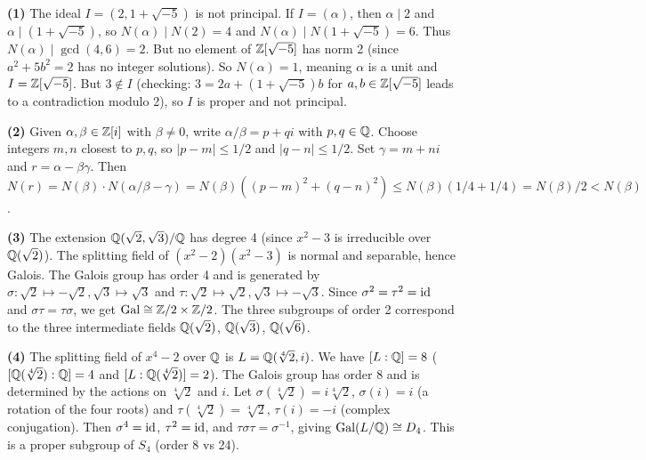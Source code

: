 \documentclass{report}
\begin{document}
\begin{solution}
\textbf{(1)} The ideal \(I = (2, 1 + \sqrt{-5})\) is not principal. If \(I = (\alpha)\), then \(\alpha \mid 2\) and \(\alpha \mid (1 + \sqrt{-5})\), so \(N(\alpha) \mid N(2) = 4\) and \(N(\alpha) \mid N(1 + \sqrt{-5}) = 6\). Thus \(N(\alpha) \mid \gcd(4, 6) = 2\). But no element of \({\ZZ}[\sqrt{-5}]\) has norm 2 (since \(a^2 + 5b^2 = 2\) has no integer solutions). So \(N(\alpha) = 1\), meaning \(\alpha\) is a unit and \(I = {\ZZ}[\sqrt{-5}]\). But \(3 \notin I\) (checking: \(3 = 2a + (1 + \sqrt{-5})b\) for \(a, b \in {\ZZ}[\sqrt{-5}]\) leads to a contradiction modulo 2), so \(I\) is proper and not principal.

\textbf{(2)} Given \(\alpha, \beta \in {\ZZ}[i]\) with \(\beta \neq 0\), write \(\alpha/\beta = p + qi\) with \(p, q \in {\QQ}\). Choose integers \(m, n\) closest to \(p, q\), so \(|p - m| \leq 1/2\) and \(|q - n| \leq 1/2\). Set \(\gamma = m + ni\) and \(r = \alpha - \beta\gamma\). Then \(N(r) = N(\beta) \cdot N(\alpha/\beta - \gamma) = N(\beta)((p-m)^2 + (q-n)^2) \leq N(\beta)(1/4 + 1/4) = N(\beta)/2 < N(\beta)\).

\textbf{(3)} The extension \({\QQ}(\sqrt{2}, \sqrt{3})/{\QQ}\) has degree 4 (since \(x^2 - 3\) is irreducible over \({\QQ}(\sqrt{2})\)). The splitting field of \((x^2 - 2)(x^2 - 3)\) is normal and separable, hence Galois. The Galois group has order 4 and is generated by \(\sigma : \sqrt{2} \mapsto -\sqrt{2}, \sqrt{3} \mapsto \sqrt{3}\) and \(\tau : \sqrt{2} \mapsto \sqrt{2}, \sqrt{3} \mapsto -\sqrt{3}\). Since \(\sigma^2 = \tau^2 = \text{id}\) and \(\sigma\tau = \tau\sigma\), we get \(\Gal \cong {\ZZ}/2 \times {\ZZ}/2\). The three subgroups of order 2 correspond to the three intermediate fields \({\QQ}(\sqrt{2})\), \({\QQ}(\sqrt{3})\), \({\QQ}(\sqrt{6})\).

\textbf{(4)} The splitting field of \(x^4 - 2\) over \({\QQ}\) is \(L = {\QQ}(\sqrt[4]{2}, i)\). We have \([L:{\QQ}] = 8\) (\([{\QQ}(\sqrt[4]{2}):{\QQ}] = 4\) and \([L:{\QQ}(\sqrt[4]{2})] = 2\)). The Galois group has order 8 and is determined by the actions on \(\sqrt[4]{2}\) and \(i\). Let \(\sigma(\sqrt[4]{2}) = i\sqrt[4]{2}\), \(\sigma(i) = i\) (a rotation of the four roots) and \(\tau(\sqrt[4]{2}) = \sqrt[4]{2}\), \(\tau(i) = -i\) (complex conjugation). Then \(\sigma^4 = \text{id}\), \(\tau^2 = \text{id}\), and \(\tau\sigma\tau = \sigma^{-1}\), giving \(\Gal(L/{\QQ}) \cong D_4\). This is a proper subgroup of \(S_4\) (order 8 vs 24).


\end{solution}
\end{document}
